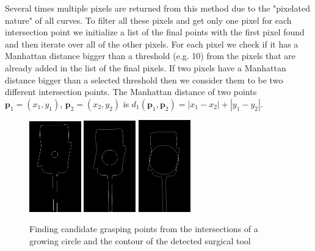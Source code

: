Several times multiple pixels are returned from this method due to the "pixelated nature" of all curves. To filter all these pixels and get only one pixel for each intersection point we initialize a list of the final points with the first pixel found and then iterate over all of the other pixels. For each pixel we check if it has a Manhattan distance bigger than a threshold (e.g. 10) from the pixels that are already added in the list of the final pixels. If two pixels have a Manhattan distance bigger than a selected threshold then we consider them to be two different intersection points. The Manhattan distance of two points $\mathbf{p}_1=(x_1,y_1)$, ${\mathbf{p}_2=(x_2,y_2)}$ is $
d_1(\mathbf{p}_1, \mathbf{p}_2) = |x_1 - x_2| + |y_1 - y_2|
$.
\begin{center}
\begin{figure}[htbp]
\centering
\includegraphics[width=0.2\textwidth]{images/grasp_points_1.png}
\includegraphics[width=0.2\textwidth]{images/grasp_points_2.png}
\includegraphics[width=0.2\textwidth]{images/grasp_points_3.png}\\
\caption{Finding candidate grasping points from the intersections of a growing circle and the contour of the detected surgical tool}
\end{figure}
\end{center}

